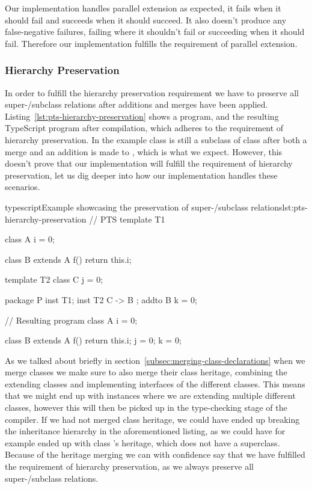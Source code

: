 Our implementation handles parallel extension as expected, it fails when it should fail and succeeds when it should succeed.
It also doesn't produce any false-negative failures, failing where it shouldn't fail or succeeding when it should fail.
Therefore our implementation fulfills the requirement of parallel extension.



\subsubsection{Hierarchy Preservation}\label{subsubsec:pts-hierarchy-preservation}

In order to fulfill the hierarchy preservation requirement we have to preserve all super-/subclass relations after additions and merges have been applied.
Listing~\vref{lst:pts-hierarchy-preservation} shows a program, and the resulting TypeScript program after compilation, which adheres to the requirement of hierarchy preservation.
In the example class  is still a subclass of class  after both a merge and an addition is made to , which is what we expect.
However, this doesn't prove that our implementation will fulfill the requirement of hierarchy preservation, let us dig deeper into how our implementation handles these scenarios.

\begin{code}{typescript}{Example showcasing the preservation of super-/subclass relations}{lst:pts-hierarchy-preservation}
    // PTS
    template T1 {
        class A {
            i = 0;
        }

        class B extends A {
            f() {
                return this.i;
            }
        }
    }

    template T2 {
        class C {
            j = 0;
        }
    }

    package P {
        inst T1;
        inst T2 { C -> B };
        addto B {
            k = 0;
        }
    }

    // Resulting program
    class A {
        i = 0;
    }

    class B extends A {
        f() {
            return this.i;
        }
        j = 0;
        k = 0;
    }
\end{code}

As we talked about briefly in section~\vref{subsec:merging-class-declarations} when we merge classes we make sure to also merge their class heritage, combining the extending classes and implementing interfaces of the different classes.
This means that we might end up with instances where we are extending multiple different classes, however this will then be picked up in the type-checking stage of the compiler.
If we had not merged class heritage, we could have ended up breaking the inheritance hierarchy in the aforementioned listing, as we could have for example ended up with class 's heritage, which does not have a superclass.
Because of the heritage merging we can with confidence say that we have fulfilled the requirement of hierarchy preservation, as we always preserve all super-/subclass relations.


